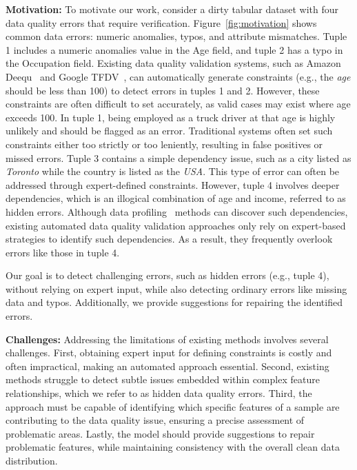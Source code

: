 \noindent \textbf{Motivation:} 
To motivate our work, consider a dirty tabular dataset with four data quality errors that require verification. 
Figure~\ref{fig:motivation} shows common data errors: numeric anomalies, typos, and attribute mismatches. Tuple 1 includes a numeric anomalies value in the Age field, and tuple 2 has a typo in the Occupation field. 
Existing data quality validation systems, such as Amazon Deequ~\cite{schelter2018automating} and Google TFDV~\cite{caveness2020tensorflow}, can automatically generate constraints (e.g., the \textit{age} should be less than 100) to detect errors in tuples 1 and 2. 
However, these constraints are often difficult to set accurately, as valid cases may exist where age exceeds 100. In tuple 1, being employed as a truck driver at that age is highly unlikely and should be flagged as an error. Traditional systems often set such constraints either too strictly or too leniently, resulting in false positives or missed errors.
Tuple 3 contains a simple dependency issue, such as a city listed as \textit{Toronto} while the country is listed as the \textit{USA}. This type of error can often be addressed through expert-defined constraints. 
However, tuple 4 involves deeper dependencies, which is an illogical combination of age and income, referred to as hidden errors. Although data profiling~\cite{maydan1991efficient,naumann2014data,abedjan2017data} methods can discover such dependencies, existing automated data quality validation approaches only rely on expert-based strategies to identify such dependencies. 
As a result, they frequently overlook errors like those in tuple 4.


Our goal is to detect challenging errors, such as hidden errors (e.g., tuple 4), without relying on expert input, while also detecting ordinary errors like missing data and typos. Additionally, we provide suggestions for repairing the identified errors.


\noindent \textbf{Challenges:} 
Addressing the limitations of existing methods involves several challenges.
First, obtaining expert input for defining constraints is costly and often impractical, making an automated approach essential.
Second, existing methods struggle to detect subtle issues embedded within complex feature relationships, which we refer to as hidden data quality errors.
Third, the approach must be capable of identifying which specific features of a sample are contributing to the data quality issue, ensuring a precise assessment of problematic areas. 
Lastly, the model should provide suggestions to repair problematic features, while maintaining consistency with the overall clean data distribution.

